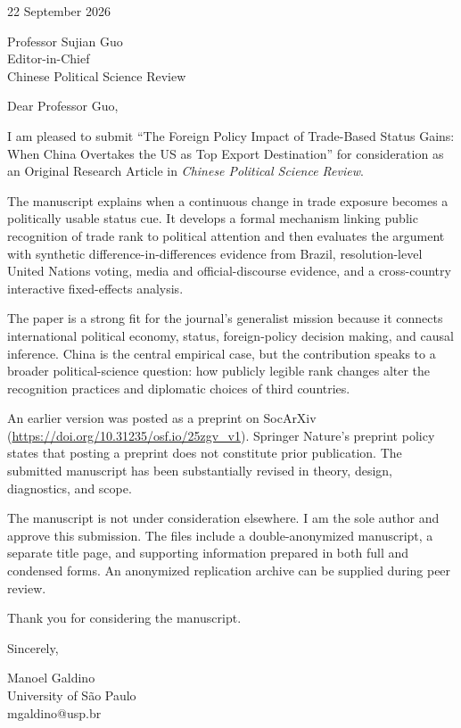 \documentclass[11pt]{article}
\begin{document}
\thispagestyle{empty}

22 September 2026

\vspace{0.6cm}

Professor Sujian Guo\\Editor-in-Chief\\Chinese Political Science Review

\vspace{0.6cm}

Dear Professor Guo,

I am pleased to submit ``The Foreign Policy Impact of Trade-Based Status Gains: When China Overtakes the US as Top Export Destination'' for consideration as an Original Research Article in \emph{Chinese Political Science Review}.

The manuscript explains when a continuous change in trade exposure becomes a politically usable status cue. It develops a formal mechanism linking public recognition of trade rank to political attention and then evaluates the argument with synthetic difference-in-differences evidence from Brazil, resolution-level United Nations voting, media and official-discourse evidence, and a cross-country interactive fixed-effects analysis.

The paper is a strong fit for the journal's generalist mission because it connects international political economy, status, foreign-policy decision making, and causal inference. China is the central empirical case, but the contribution speaks to a broader political-science question: how publicly legible rank changes alter the recognition practices and diplomatic choices of third countries.

An earlier version was posted as a preprint on SocArXiv (\url{https://doi.org/10.31235/osf.io/25zgv_v1}). Springer Nature's preprint policy states that posting a preprint does not constitute prior publication. The submitted manuscript has been substantially revised in theory, design, diagnostics, and scope.

The manuscript is not under consideration elsewhere. I am the sole author and approve this submission. The files include a double-anonymized manuscript, a separate title page, and supporting information prepared in both full and condensed forms. An anonymized replication archive can be supplied during peer review.

Thank you for considering the manuscript.

Sincerely,

Manoel Galdino\\University of S\~{a}o Paulo\\mgaldino@usp.br
\end{document}

